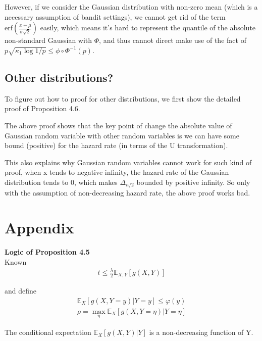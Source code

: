 \documentclass{article}
\theoremstyle{plain}
\begin{document}
However, if we consider the Gaussian distribution with non-zero mean (which is a necessary assumption of bandit settings), we cannot get rid of the term $\text{erf}(\frac{x + \mu}{\sigma \sqrt{2}})$ easily, which means it's hard to represent the quantile of the absolute non-standard Gaussian with $\Phi$, and thus cannot direct make use of the fact of $p \sqrt{\kappa_{1} \log 1 / p} \leq \phi \circ \Phi^{-1}(p)$.

\subsection{Other distributions?}
To figure out how to proof for other distributions, we first show the detailed proof of \cite{boucheron2012} Proposition 4.6. 

The above proof shows that the key point of change the absolute value of Gaussian random variable with other random variables is we can have some bound (positive) for the hazard rate (in terms of the U transformation). 

This also explains why Gaussian random variables cannot work for such kind of proof, when x tends to negative infinity, the hazard rate of the Gaussian distribution tends to 0, which makes $\Delta_{n/2}$ bounded by positive infinity. So only with the assumption of non-decreasing hazard rate, the above proof works bad. 



\section*{Appendix}

\textbf{Logic of Proposition 4.5}\\

Known
\begin{align}
    t \leq  \frac{\lambda}{2} \mathbb{E}_{X, Y}[g(X, Y)]
\end{align}

and define
\begin{align}
    \mathbb{E}_X[g(X, Y = y)| Y = y] \leq \varphi (y)\\
    \rho = \max_{\eta} \mathbb{E}_X[g(X, Y = \eta)|Y = \eta]
\end{align}

The conditional expectation $\mathbb{E}_X[g(X, Y)| Y]$ is a non-decreasing function of Y.\\
\end{document}
